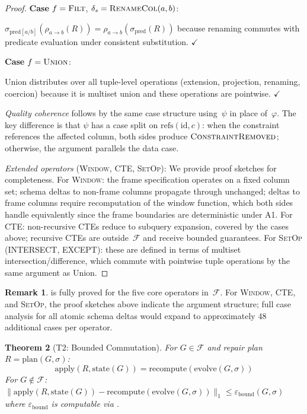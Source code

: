\documentclass[11pt,a4paper]{article}
\newtheorem{theorem}{Theorem}[section]
\theoremstyle{definition}
\newtheorem{remark}[theorem]{Remark}
\newcommand{\FragF}{\mathcal{F}}
\newcommand{\ebound}{\varepsilon_{\mathrm{bound}}}
\begin{document}
\begin{proof}
\textbf{Case} $f = \textsc{Filt}$, $\delta_s = \textsc{RenameCol}(a, b)$:

$\sigma_{\mathrm{pred}[a/b]}(\rho_{a \to b}(R))
= \rho_{a \to b}(\sigma_{\mathrm{pred}}(R))$
because renaming commutes with predicate evaluation under consistent
substitution. $\checkmark$

\textbf{Case} $f = \textsc{Union}$:

Union distributes over all tuple-level operations (extension, projection,
renaming, coercion) because it is multiset union and these operations are
pointwise. $\checkmark$

\emph{Quality coherence} follows by the same case structure using~$\psi$
in place of~$\varphi$.  The key difference is that $\psi$ has a case split on
$\mathrm{refs}(\mathrm{id}, c)$: when the constraint references the affected
column, both sides produce $\textsc{ConstraintRemoved}$; otherwise, the
argument parallels the data case.

\emph{Extended operators} (\textsc{Window}, \textsc{CTE}, \textsc{SetOp}):
We provide proof sketches for completeness.
For \textsc{Window}: the frame specification operates on a fixed column set;
schema deltas to non-frame columns propagate through unchanged; deltas to
frame columns require recomputation of the window function, which both sides
handle equivalently since the frame boundaries are deterministic under A1.
For \textsc{CTE}: non-recursive CTEs reduce to subquery expansion, covered
by the cases above; recursive CTEs are outside~$\FragF$ and receive bounded
guarantees.
For \textsc{SetOp} (INTERSECT, EXCEPT): these are defined in terms of
multiset intersection/difference, which commute with pointwise tuple
operations by the same argument as Union.
\end{proof}

\begin{remark}
 is fully proved for the five core operators in~$\FragF$.
For \textsc{Window}, \textsc{CTE}, and \textsc{SetOp}, the proof sketches above
indicate the argument structure; full case analysis for all atomic schema deltas
would expand to approximately 48 additional cases per operator.
\end{remark}

\begin{theorem}[T2: Bounded Commutation]\label{thm:commutation}
For $G \in \FragF$ and repair plan $R = \mathrm{plan}(G, \sigma)$:
\begin{equation}\label{eq:perfect-commutation}
\mathrm{apply}(R, \mathrm{state}(G)) = \mathrm{recompute}(\mathrm{evolve}(G, \sigma))
\end{equation}
For $G \notin \FragF$:
$\|\mathrm{apply}(R, \mathrm{state}(G)) - \mathrm{recompute}(\mathrm{evolve}(G, \sigma))\|_1
\leq \ebound(G, \sigma)$
where $\ebound$ is computable via .
\end{theorem}
\end{document}
